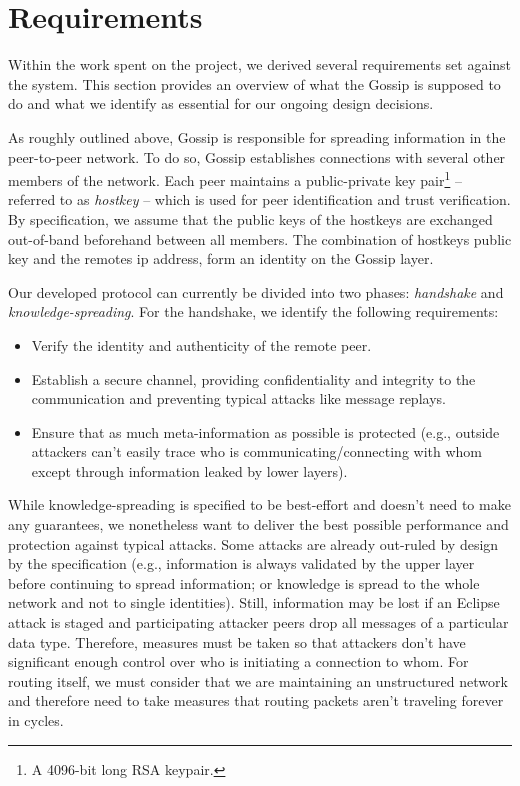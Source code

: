 \section{Requirements}\label{sec:requirements}

Within the work spent on the project, we derived several requirements set against the system.
This section provides an overview of what the Gossip is supposed to do and what we identify as essential
for our ongoing design decisions.

As roughly outlined above, Gossip is responsible for spreading information in the peer-to-peer network.
To do so, Gossip establishes connections with several other members of the network.
Each peer maintains a public-private key pair\footnote{A 4096-bit long RSA keypair.} -- referred to
as \textit{hostkey} -- which is used for peer identification and trust verification.
By specification, we assume that the public keys of the hostkeys are exchanged out-of-band
beforehand between all members.
The combination of hostkeys public key and the remotes ip address, form an identity on the Gossip layer.

Our developed protocol can currently be divided into two phases: \textit{handshake} and \textit{knowledge-spreading}.
For the handshake, we identify the following requirements:
\begin{itemize}
    \setlength\itemsep{0em}
    \item Verify the identity and authenticity of the remote peer.
    \item Establish a secure channel, providing confidentiality and integrity to the communication
    and preventing typical attacks like message replays.
    \item Ensure that as much meta-information as possible is protected (e.g., outside attackers can't easily
    trace who is communicating/connecting with whom except through information leaked by lower layers).
\end{itemize}

While knowledge-spreading is specified to be best-effort and doesn't need to make any guarantees,
we nonetheless want to deliver the best possible performance and protection against typical attacks.
Some attacks are already out-ruled by design by the specification (e.g., information is always validated
by the upper layer before continuing to spread information;
or knowledge is spread to the whole network and not to single identities).
Still, information may be lost if an Eclipse attack is staged and participating attacker peers drop all messages
of a particular data type.
Therefore, measures must be taken so that attackers don't have significant enough control over who is
initiating a connection to whom.
For routing itself, we must consider that we are maintaining an unstructured network and therefore need to
take measures that routing packets aren’t traveling forever in cycles.

